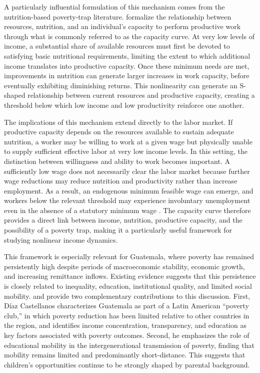 \documentclass{article}
\begin{document}
A particularly influential formulation of this mechanism comes from the nutrition-based poverty-trap literature. \textcite{dasgupta1986} formalize the relationship between resources, nutrition, and an individual's capacity to perform productive work through what is commonly referred to as the capacity curve. At very low levels of income, a substantial share of available resources must first be devoted to satisfying basic nutritional requirements, limiting the extent to which additional income translates into productive capacity. Once these minimum needs are met, improvements in nutrition can generate larger increases in work capacity, before eventually exhibiting diminishing returns. This nonlinearity can generate an S-shaped relationship between current resources and productive capacity, creating a threshold below which low income and low productivity reinforce one another.

The implications of this mechanism extend directly to the labor market. If productive capacity depends on the resources available to sustain adequate nutrition, a worker may be willing to work at a given wage but physically unable to supply sufficient effective labor at very low income levels. In this setting, the distinction between willingness and ability to work becomes important. A sufficiently low wage does not necessarily clear the labor market because further wage reductions may reduce nutrition and productivity rather than increase employment. As a result, an endogenous minimum feasible wage can emerge, and workers below the relevant threshold may experience involuntary unemployment even in the absence of a statutory minimum wage \parencite{stiglitz1976,blissstern1978,dasgupta1986}. The capacity curve therefore provides a direct link between income, nutrition, productive capacity, and the possibility of a poverty trap, making it a particularly useful framework for studying nonlinear income dynamics.

This framework is especially relevant for Guatemala, where poverty has remained persistently high despite periods of macroeconomic stability, economic growth, and increasing remittance inflows. Existing evidence suggests that this persistence is closely related to inequality, education, institutional quality, and limited social mobility. \textcite{diazcastellanos2018} and \textcite{diazcastellanos2019} provide two complementary contributions to this discussion. First, Díaz Castellanos characterizes Guatemala as part of a Latin American ``poverty club,'' in which poverty reduction has been limited relative to other countries in the region, and identifies income concentration, transparency, and education as key factors associated with poverty outcomes. Second, he emphasizes the role of educational mobility in the intergenerational transmission of poverty, finding that mobility remains limited and predominantly short-distance. This suggests that children's opportunities continue to be strongly shaped by parental background.
\end{document}

